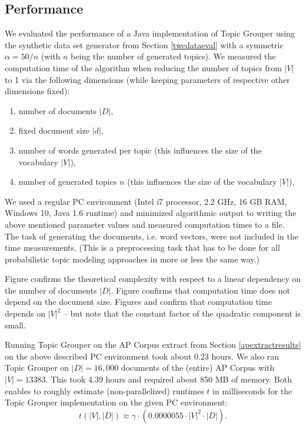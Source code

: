 \documentclass[10pt, a4paper, oneside]{article}
\begin{document}
\subsection{Performance}

We evaluated the performance of a Java implementation of Topic Grouper 
using the synthetic data set generator from Section \ref{twcdataeval} with a symmetric $\alpha = 50 / n$ (with $n$ being the number of generated topics).
We measured the computation time of the algorithm when reducing the number of topics from $|V|$ to 1 via the following dimensions (while keeping  parameters of respective other dimensions fixed):
\begin{enumerate}
\item number of documents $|D|$,
\item fixed document size $|d|$,
\item number of words generated per topic (this influences the size of the vocabulary $|V|$),
\item number of generated topics $n$ (this influences the size of the vocabulary $|V|$),
\end{enumerate}
We used a regular PC environment (Intel i7 processor, 2.2 GHz, 16 GB RAM, Windows 10, Java 1.6 runtime) and minimized algorithmic output to writing the above mentioned parameter values and measured computation times to a file.
The task of generating the documents, i.e. word vectors, were not included in the time measurements.
(This is a preprocessing task that has to be done for all probabilistic topic modeling approaches in more or less the same way.)

Figure \cite{perf1} confirms the theoretical complexity with respect to a linear dependency on the number of documents $|D|$.
Figure \cite{perf2} confirms that computation time does not depend on the document size.
Figures \cite{perf3} and \cite{perf4} confirm that computation time depends on $|V|^2$ -- but note that the constant factor of the quadratic component is small.

Running Topic Grouper on the AP Corpus extract from Section \ref{apextractresults} on the above described PC environment took about 0.23 hours.
We also ran Topic Grouper on $|D| = 16,000$ documents of the (entire) AP Corpus with $|V| = 13383$. This took 4.39 hours and required about 850 MB of memory. Both enables to roughly estimate (non-parallelized) runtimes $t$ in milliseconds for the Topic Grouper implementation on the given PC environment:
\[ t(|V|,|D|) \approx \gamma \cdot (0.0000055 \cdot |V|^2 \cdot |D|).\]
\end{document}
